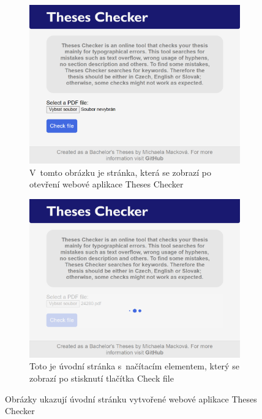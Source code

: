 \begin{figure}[H]
    
    \begin{subfigure}[b]{0.496\linewidth}
        \includegraphics[width=\linewidth]{obrazky-figures/screenshot-page1-small.png}
        \caption{V~tomto obrázku je stránka, která se zobrazí po otevření webové aplikace Theses Checker}
        \label{pic_theses_checker_page1_sub1}
    \end{subfigure}
    \hfill
    \begin{subfigure}[b]{0.496\linewidth}
        \includegraphics[width=\linewidth]{obrazky-figures/screenshot-loading-small.png}
        \caption{Toto je úvodní stránka s~načítacím elementem, který se zobrazí po stisknutí tlačítka Check file}
        \label{pic_theses_checker_page1_sub2}
    \end{subfigure}
    \caption[]{Obrázky ukazují úvodní stránku vytvořené webové aplikace Theses Checker}
    \label{pic_theses_checker_page1}
\end{figure}

